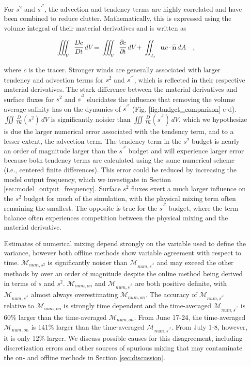 \documentclass[draft]{agujournal2019}
\begin{document}
For $s^2$ and $s^{\prime^2}$, the advection and tendency terms are highly correlated and have been combined to reduce clutter. Mathematically, this is expressed using the volume integral of their material derivatives and is written as 
\begin{linenomath*}
\begin{equation}
    \iiint_V \frac{Dc}{Dt} \, dV = \iiint_V \frac{\partial c}{\partial t} \, dV + \iint_{A_l} \mathbf{u}c \cdot \hat{\mathbf{n}} \, dA \quad ,
\end{equation}
\end{linenomath*}
 where $c$ is the tracer. Stronger winds are generally associated with larger tendency and advection terms for $s^2$ and $s^{\prime^2}$, which is reflected in their respective material derivatives. The stark difference between the material derivatives and surface fluxes for $s^2$ and $s^{\prime^2}$ elucidates the influence that removing the volume average salinity has on the dynamics of $s^{\prime^2}$ (Fig. \ref{fig:budget_comparison} c-d). $\iiint \frac{D}{Dt}(s^2) \, dV$ is significantly noisier than $\iiint \frac{D}{Dt}(s^{\prime^2}) \, dV$, which we hypothesize is due the larger numerical error associated with the tendency term, and to a lesser extent, the advection term. The tendency term in the $s^2$ budget is nearly an order of magnitude larger than the $s^{\prime^2}$ budget and will experience larger error because both tendency terms are calculated using the same numerical scheme (i.e., centered finite differences). This error could be reduced by increasing the model output frequency, which we investigate in Section \ref{sec:model_output_frequency}. Surface $s^2$ fluxes exert a much larger influence on the $s^2$ budget for much of the simulation, with the physical mixing term often remaining the smallest. The opposite is true for the $s^{\prime^2}$ budget, where the term balance often experiences competition between the physical mixing and the material derivative.  

Estimates of numerical mixing depend strongly on the variable used to define the variance, however both offline methods show variable agreement with respect to time. $\mathcal{M}_{num, s^2}$ is significantly noisier than $\mathcal{M}_{num, s^{\prime^2}}$ and may exceed the other methods by over an order of magnitude despite the online method being derived in terms of $s$ and $s^2$.  $\mathcal{M}_{num, on}$ and $\mathcal{M}_{num, s^{\prime^2}}$ are both positive definite, with $\mathcal{M}_{num, s^{\prime^2}}$ almost always overestimating $\mathcal{M}_{num, on}$. The accuracy of $\mathcal{M}_{num, s^{\prime^2}}$ relative to $\mathcal{M}_{num, on}$ is strongly time dependent and the time-averaged $\mathcal{M}_{num, s^{\prime^2}}$ is 60\% larger than the time-averaged $\mathcal{M}_{num, on}$. From June 17-24, the time-averaged $\mathcal{M}_{num, on}$ is 141\% larger than the time-averaged $\mathcal{M}_{num, s^{\prime^2}}$. From July 1-8, however, it is only 12\% larger. We discuss possible causes for this disagreement, including discretization errors and other sources of spurious mixing that may contaminate the on- and offline methods in Section \ref{sec:discussion}. 
\end{document}
